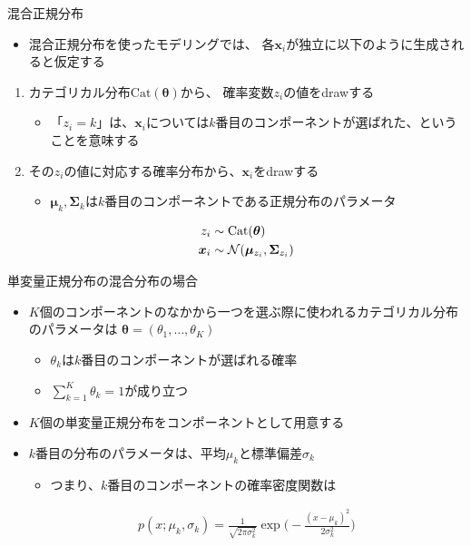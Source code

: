 \documentclass[aspectratio=169,unicode,dvipdfmx,14pt]{beamer}
\begin{document}
\begin{frame}{混合正規分布}
\begin{itemize}
\item 混合正規分布を使ったモデリングでは、
各$\bm{x}_i$が独立に以下のように生成されると仮定する
\end{itemize}
\vspace{.1in}
\begin{enumerate}
\item カテゴリカル分布$\mbox{Cat}(\bm{\theta})$から、
確率変数$z_i$の値をdrawする
\begin{itemize}
\item 「$z_i = k$」は、$\bm{x}_i$については$k$番目のコンポーネントが選ばれた、ということを意味する
\end{itemize}
\item その$z_i$の値に対応する確率分布から、$\bm{x}_i$をdrawする
\begin{itemize}
\item $\bm{\mu}_k, \bm{\Sigma}_k$は$k$番目のコンポーネントである正規分布のパラメータ
\end{itemize}
\begin{align}
z_i & \sim \mbox{Cat}(\bm{\theta}) \notag \\
\bm{x}_i & \sim \mathcal{N}(\bm{\mu}_{z_i}, \bm{\Sigma}_{z_i})
\end{align}
\end{enumerate}
\end{frame}

\begin{frame}{単変量正規分布の混合分布の場合}
\begin{itemize}
\item $K$個のコンポーネントのなかから一つを選ぶ際に使われるカテゴリカル分布のパラメータは
$\bm{\theta} = (\theta_1,\ldots,\theta_K)$
\begin{itemize}
\item $\theta_k$は$k$番目のコンポーネントが選ばれる確率
\item $\sum_{k=1}^K \theta_k = 1$が成り立つ
\end{itemize}
\item $K$個の単変量正規分布をコンポーネントとして用意する
\item $k$番目の分布のパラメータは、平均$\mu_k$と標準偏差$\sigma_k$
\begin{itemize}
\item つまり、$k$番目のコンポーネントの確率密度関数は
\end{itemize}
\begin{align}
p(x;\mu_k,\sigma_k) = \frac{1}{\sqrt{2\pi\sigma_k^2}}\exp\Big( - \frac{(x - \mu_k)^2}{2\sigma_k^2} \Big)
\end{align}
\end{itemize}
\end{frame}
\end{document}
